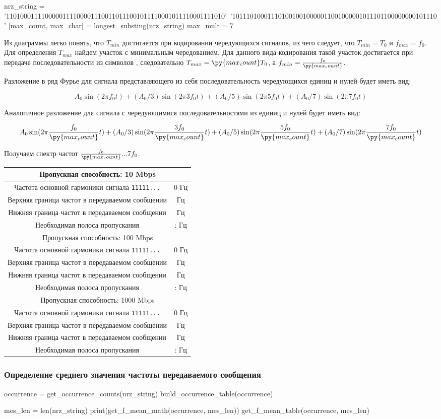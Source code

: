 \documentclass[12pt, a4paper]{article}
\newcommand{\bandwidthEntry}[1]{
  \hline
  \multicolumn{2}{|c|}{Пропускная способность: #1 Mbps} \\
  \hline
  Частота основной гармоники сигнала \texttt{11111...} & 0 Гц \\
  Верхняя граница частот в передаваемом сообщении & \py{int(max_mult * f_0[#1])} Гц \\
  Нижняя граница частот в передаваемом сообщении & \py{int(f_0[#1] / max_count)} Гц \\
  Необходимая полоса пропускания & \py{int(f_0[#1] / max_count)} : \py{int(max_mult * f_0[#1])} Гц \\
}
\begin{document}
\begin{pycode}
nrz_string = '11010001111000001111000011100110111001011110001011110001111010'\
  '1011101000111010010010000011001000001011101100000000101110'
[max_count, max_char] = longest_substing(nrz_string)
max_mult = 7
\end{pycode}

Из диаграммы легко понять, что $T_{min}$ достигается при кодировании чередующихся
сигналов, из чего следует, что $T_{min} = T_0$ и $f_{max} = f_0$. Для определения
$T_{max}$ найдем участок с минимальным чередованием. Для данного вида кодирования
такой участок достигается при передаче последовательности из \py{max_count}
символов \texttt{\py{max_char}},
следовательно $T_{max} = \py{max_count} T_0$, а $f_{min} = \frac{f_0}{\py{max_count}}$.

Разложение в ряд Фурье для сигнала представляющего из себя последовательность
чередующихся единиц и нулей будет иметь вид:

$$A_0 \sin(2 \pi f_0 t) + (A_0 / 3) \sin(2 \pi 3 f_0 t) +
  (A_0 / 5) \sin(2 \pi 5 f_0 t) + (A_0 / 7) \sin(2 \pi 7 f_0 t)$$

Аналогичное разложение для сигнала с чередующимися последовательностями из
\py{max_count} единиц и нулей будет иметь вид:

$$A_0 \sin(2 \pi \frac{f_0}{\py{max_count}} t) + (A_0 / 3) \sin(2 \pi \frac{3 f_0}{\py{max_count}} t) +
  (A_0 / 5) \sin(2 \pi \frac{5 f_0}{\py{max_count}} t) + (A_0 / 7) \sin(2 \pi \frac{7 f_0}{\py{max_count}} t)$$

Получаем спектр частот $\frac{f_0}{\py{max_count}}...7 f_0$.

\newpage

\begin{tabular}{| c | c |}
  \bandwidthEntry{10}
  \bandwidthEntry{100}
  \bandwidthEntry{1000}
  \hline
\end{tabular}

\subsubsection*{Определение среднего значения чаcтоты передаваемого сообщения}

\begin{pycode}
occurrence = get_occurrence_counts(nrz_string)
build_occurrence_table(occurrence)
\end{pycode}

\begin{pycode}
mes_len = len(nrz_string)
print(get_f_mean_math(occurrence, mes_len))
get_f_mean_table(occurrence, mes_len)
\end{pycode}
\end{document}
